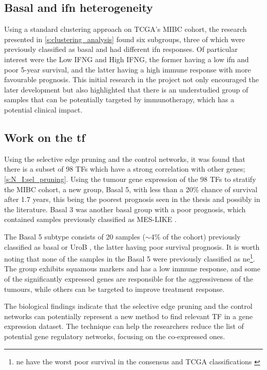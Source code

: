 \subsection*{Basal and \acrlong{ifn} heterogeneity}

Using a standard clustering approach on TCGA's MIBC cohort, the research presented in \cref{s:clustering_analysis} found six subgroups, three of which were previously classified as basal and had different \acrshort{ifn} responses. Of particular interest were the Low IFNG and High IFNG, the former having a low \acrshort{ifn} and poor 5-year survival, and the latter having a high immune response with more favourable prognosis. This initial research in the project not only encouraged the later development but also highlighted that there is an understudied group of samples that can be potentially targeted by immunotherapy, which has a potential clinical impact.


\subsection*{Work on the \acrlong{tf}}

Using the selective edge pruning and the control networks, it was found that there is a subset of 98 TFs which have a strong correlation with other genes; \cref{s:N_I:sel_pruning}. Using the tumour gene expression of the 98 TFs to stratify the MIBC cohort, a new group, Basal 5, with less than a 20\% chance of survival after 1.7 years, this being the poorest prognosis seen in the thesis and possibly in the literature. Basal 3 was another basal group with a poor prognosis, which contained samples previously classified as \gls{MES-LIKE} \citep{Marzouka2018-ge}.

The Basal 5 subtype consists of 20 samples ($\sim$4\% of the cohort) previously classified as basal \citep{Kamoun2020-tj,Robertson2017-mg} or UroB \citep{Marzouka2018-ge}, the latter having poor survival prognosis. It is worth noting that none of the samples in the Basal 5 were previously classified as \acrlong{ne}\footnote{\acrlong{ne} have the worst poor survival in the consensus and TCGA classifications \citep{Kamoun2020-tj,Robertson2017-mg}}. The group exhibits squamous markers and has a low immune response, and some of the significantly expressed genes are responsible for the aggressiveness of the tumours, while others can be targeted to improve treatment response.

The biological findings indicate that the selective edge pruning and the control networks can potentially represent a new method to find relevant \gls{TF} in a gene expression dataset. The technique can help the researchers reduce the list of potential gene regulatory networks, focusing on the co-expressed ones.

